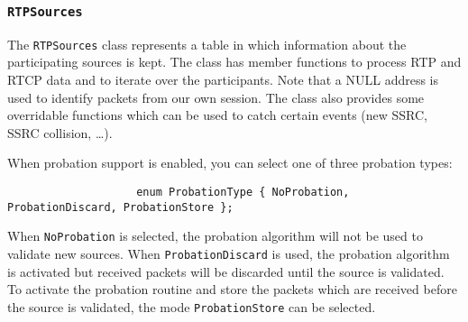 \documentclass[12pt,a4paper]{article}
\newcommand{\headerfile}[1]{\marginpar{\scriptsize Header:\\{\tt #1}}}
\begin{document}
			\subsubsection{\tt RTPSources}\headerfile{rtpsources.h}
	
				The {\tt RTPSources} class represents a table in which information
				about the participating sources is kept. The class has member
				functions to process RTP and RTCP data and to iterate over the
				participants. Note that a NULL address is used to identify packets
				from our own session. The class also provides some overridable
				functions which can be used to catch certain events (new SSRC,
				SSRC collision, \ldots).
				
				When probation support is enabled, you can select one of
				three probation types:
				\begin{verbatim}
					enum ProbationType { NoProbation, ProbationDiscard, ProbationStore };
				\end{verbatim}
				When {\tt NoProbation} is selected, the probation algorithm will
				not be used to validate new sources. When {\tt ProbationDiscard}
				is used, the probation algorithm is activated but received packets
				will be discarded until the source is validated. To activate the
				probation routine and store the packets which are received before
				the source is validated, the mode {\tt ProbationStore} can be
				selected.
\end{document}
